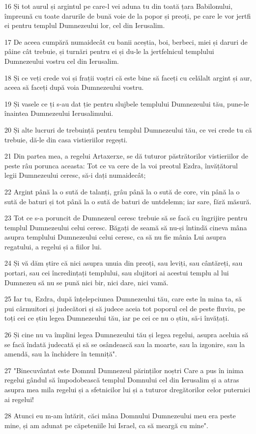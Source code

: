 \par 16 Și tot aurul și argintul pe care-l vei aduna tu din toată țara Babilonului, împreună cu toate darurile de bună voie de la popor și preoți, pe care le vor jertfi ei pentru templul Dumnezeului lor, cel din Ierusalim.
\par 17 De aceea cumpără numaidecât cu banii aceștia, boi, berbeci, miei și daruri de pâine cât trebuie, și turnări pentru ei și du-le la jertfelnicul templului Dumnezeului vostru cel din Ierusalim.
\par 18 Și ce veți crede voi și frații voștri că este bine să faceți cu celălalt argint și aur, aceea să faceți după voia Dumnezeului vostru.
\par 19 Și vasele ce ți s-au dat ție pentru slujbele templului Dumnezeului tău, pune-le înaintea Dumnezeului Ierusalimului.
\par 20 Și alte lucruri de trebuință pentru templul Dumnezeului tău, ce vei crede tu că trebuie, dă-le din casa vistieriilor regești.
\par 21 Din partea mea, a regelui Artaxerxe, se dă tuturor păstrătorilor vistieriilor de peste râu porunca aceasta: Tot ce va cere de la voi preotul Ezdra, învățătorul legii Dumnezeului ceresc, să-i dați numaidecât;
\par 22 Argint până la o sută de talanți, grâu până la o sută de core, vin până la o sută de baturi și tot până la o sută de baturi de untdelemn; iar sare, fără măsură.
\par 23 Tot ce s-a poruncit de Dumnezeul ceresc trebuie să se facă cu îngrijire pentru templul Dumnezeului celui ceresc. Băgați de seamă să nu-și întindă cineva mâna asupra templului Dumnezeului celui ceresc, ca să nu fie mânia Lui asupra regatului, a regelui și a fiilor lui.
\par 24 Și vă dăm știre că nici asupra unuia din preoți, sau leviți, sau cântăreți, sau portari, sau cei încredințați templului, sau slujitori ai acestui templu al lui Dumnezeu să nu se pună nici bir, nici dare, nici vamă.
\par 25 Iar tu, Ezdra, după înțelepciunea Dumnezeului tău, care este în mina ta, să pui cârmuitori și judecători și să judece aceia tot poporul cel de peste fluviu, pe toți cei ce știu legea Dumnezeului tău, iar pe cei ce nu o știu, să-i învățați.
\par 26 Și cine nu va împlini legea Dumnezeului tău și legea regelui, asupra aceluia să se facă îndată judecată și să se osândească sau la moarte, sau la izgonire, sau la amendă, sau la închidere în temniță".
\par 27 "Binecuvântat este Domnul Dumnezeul părinților noștri Care a pus în inima regelui gândul să împodobească templul Domnului cel din Ierusalim și a atras asupra mea mila regelui și a sfetnicilor lui și a tuturor dregătorilor celor puternici ai regelui!
\par 28 Atunci eu m-am întărit, căci mâna Domnului Dumnezeului meu era peste mine, și am adunat pe căpeteniile lui Israel, ca să meargă cu mine".

